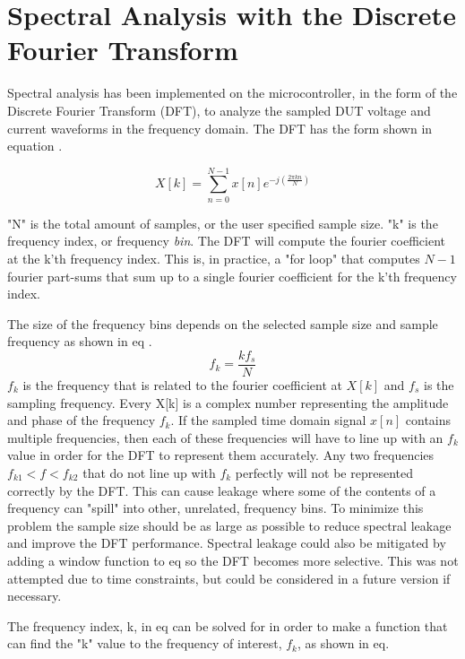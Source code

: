 \section{Spectral Analysis with the Discrete Fourier Transform} \label{subsec:SpectralAnalysis} 

Spectral analysis has been implemented on the microcontroller, in the form of the Discrete Fourier Transform (DFT), to analyze the sampled DUT voltage and current waveforms in the frequency domain. The DFT has the form shown in equation .

\begin{equation}\label{eq:4_7_2_SA1}
    X[k] = \sum_{n=0}^{N-1} x[n] e^{-j(\frac{2\pi kn}{N})}
\end{equation}

"N" is the total amount of samples, or the user specified sample size. "k" is the frequency index, or frequency \textit{bin}. The DFT will compute the fourier coefficient at the k'th frequency index. This is, in practice, a "for loop" that computes $N-1$ fourier part-sums that sum up to a single fourier coefficient for the k'th frequency index.

The size of the frequency bins depends on the selected sample size and sample frequency as shown in eq .
\begin{equation}\label{eq:4_7_2_SA3}
    f_k = \frac{kf_s}{N} 
\end{equation}
$f_k$ is the frequency that is related to the fourier coefficient at $X[k]$ and $f_s$ is the sampling frequency. Every X[k] is a complex number representing the amplitude and phase of the frequency $f_k$. If the sampled time domain signal $x[n]$ contains multiple frequencies, then each of these frequencies will have to line up with an $f_k$ value in order for the DFT to represent them accurately. Any two frequencies $f_{k1} < f < f_{k2}$ that do not line up with $f_k$ perfectly will not be represented correctly by the DFT. This can cause leakage where some of the contents of a frequency can "spill" into other, unrelated, frequency bins. To minimize this problem the sample size should be as large as possible to reduce spectral leakage and improve the DFT performance. Spectral leakage could also be mitigated by adding a window function to eq  so the DFT becomes more selective. This was not attempted due to time constraints, but could be considered in a future version if necessary.

The frequency index, k, in eq  can be solved for in order to make a function that can find the "k" value to the frequency of interest, $f_k$, as shown in eq.

